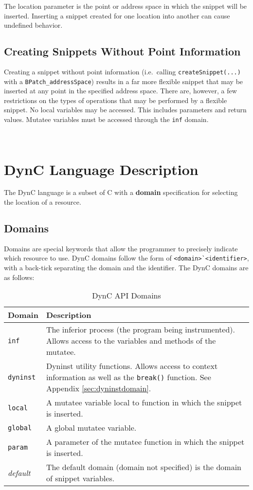 \documentclass{article}
\begin{document}
The location parameter is the point or address space in which the snippet will be inserted. Inserting a snippet created for one location into another can cause undefined behavior.

\subsection{Creating Snippets Without Point Information}
\label{sec:nopoint}
Creating a snippet without point information (i.e.\ calling \verb!createSnippet(...)! with a \verb!BPatch_addressSpace!) results in a far more flexible snippet that may be inserted at any point in the specified address space. There are, however, a few restrictions on the types of operations that may be performed by a flexible snippet. No local variables may be accessed. This includes parameters and return values. Mutatee variables must be accessed through the \verb!inf! domain.

\\
\section{DynC Language Description}
The DynC language is a subset of C with a \textbf{domain} specification for selecting the location of a resource.
\subsection{Domains}
Domains are special keywords that allow the programmer to precisely indicate which resource to use. 
DynC domains follow the form of \verb!<domain>`<identifier>!, with a back-tick separating the domain and the identifier. The DynC domains are as follows:

\begin{table}[!th]
\begin{tabular}{ | l | p{12cm} |}
\hline
Domain & Description\\
\hline
\verb!inf! & The inferior process (the program being instrumented). Allows access to the variables and methods of the mutatee.\\
\hline
\verb!dyninst! & Dyninst utility functions. Allows access to context information as well as the \verb!break()! function. See Appendix \ref{sec:dyninstdomain}.\\
\hline
\verb!local! & A mutatee variable local to function in which the snippet is inserted. \\
\hline
\verb!global! & A global mutatee variable. \\
\hline
\verb!param! & A parameter of the mutatee function in which the snippet is inserted. \\
\hline
\textit{default} & The default domain (domain not specified) is the domain of snippet variables. \\
\hline

\end{tabular}
\caption{DynC API Domains}
\end{table}
\end{document}
